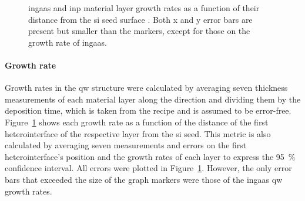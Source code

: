 \begin{figure}
    \centering
    \caption[\acs{ingaas} and \acs{inp} material layer growth rates as a function of their distance from the \acs{si} seed surface in sample 6.]{\acs{ingaas} and \acs{inp} material layer growth rates as a function of their distance from the \acs{si} seed surface \cite{Brugnolotto2023_2}. Both x and y error bars are present but smaller than the markers, except for those on the growth rate of \acs{ingaas}.}
    \label{fig:s6_growth_rates}
\end{figure}

\paragraph{Growth rate} Growth rates in the \acl{qw} structure were calculated by averaging seven thickness measurements of each material layer along the  direction and dividing them by the deposition time, which is taken from the recipe and is assumed to be error-free. Figure~\ref{fig:s6_growth_rates} shows each growth rate as a function of the distance of the first heterointerface of the respective layer from the \acs{si} seed. This metric is also calculated by averaging seven measurements and errors on the first heterointerface's position and the growth rates of each layer to express the \qty{95}{\%} confidence interval. All errors were plotted in Figure~\ref{fig:s6_growth_rates}. However, the only error bars that exceeded the size of the graph markers were those of the \acs{ingaas} \acl{qw} growth rates.

